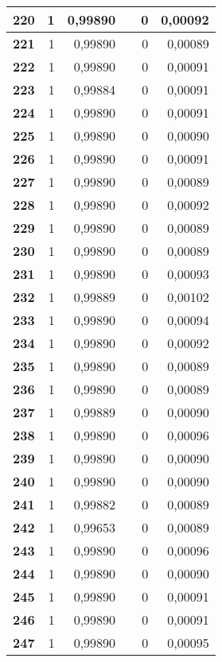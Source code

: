 {\begin{longtable}{|r|r|r|l|r|r|}
\textbf{220} & 1 & 0,99890 &  & 0 & 0,00092 \\ \hline
\textbf{221} & 1 & 0,99890 &  & 0 & 0,00089 \\ \hline
\textbf{222} & 1 & 0,99890 &  & 0 & 0,00091 \\ \hline
\textbf{223} & 1 & 0,99884 &  & 0 & 0,00091 \\ \hline
\textbf{224} & 1 & 0,99890 &  & 0 & 0,00091 \\ \hline
\textbf{225} & 1 & 0,99890 &  & 0 & 0,00090 \\ \hline
\textbf{226} & 1 & 0,99890 &  & 0 & 0,00091 \\ \hline
\textbf{227} & 1 & 0,99890 &  & 0 & 0,00089 \\ \hline
\textbf{228} & 1 & 0,99890 &  & 0 & 0,00092 \\ \hline
\textbf{229} & 1 & 0,99890 &  & 0 & 0,00089 \\ \hline
\textbf{230} & 1 & 0,99890 &  & 0 & 0,00089 \\ \hline
\textbf{231} & 1 & 0,99890 &  & 0 & 0,00093 \\ \hline
\textbf{232} & 1 & 0,99889 &  & 0 & 0,00102 \\ \hline
\textbf{233} & 1 & 0,99890 &  & 0 & 0,00094 \\ \hline
\textbf{234} & 1 & 0,99890 &  & 0 & 0,00092 \\ \hline
\textbf{235} & 1 & 0,99890 &  & 0 & 0,00089 \\ \hline
\textbf{236} & 1 & 0,99890 &  & 0 & 0,00089 \\ \hline
\textbf{237} & 1 & 0,99889 &  & 0 & 0,00090 \\ \hline
\textbf{238} & 1 & 0,99890 &  & 0 & 0,00096 \\ \hline
\textbf{239} & 1 & 0,99890 &  & 0 & 0,00090 \\ \hline
\textbf{240} & 1 & 0,99890 &  & 0 & 0,00090 \\ \hline
\textbf{241} & 1 & 0,99882 &  & 0 & 0,00089 \\ \hline
\textbf{242} & 1 & 0,99653 &  & 0 & 0,00089 \\ \hline
\textbf{243} & 1 & 0,99890 &  & 0 & 0,00096 \\ \hline
\textbf{244} & 1 & 0,99890 &  & 0 & 0,00090 \\ \hline
\textbf{245} & 1 & 0,99890 &  & 0 & 0,00091 \\ \hline
\textbf{246} & 1 & 0,99890 &  & 0 & 0,00091 \\ \hline
\textbf{247} & 1 & 0,99890 &  & 0 & 0,00095 \\ \hline

\end{longtable}}
